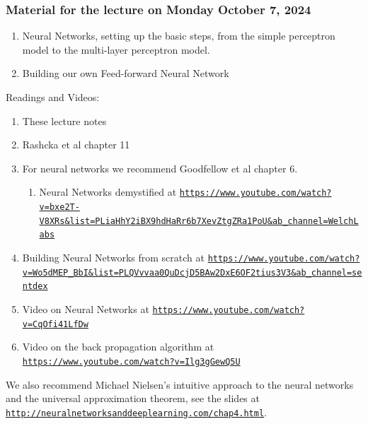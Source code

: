 \documentclass{beamer}
\begin{document}
\begin{frame}
\frametitle{Material for the lecture on Monday October 7, 2024}

\begin{enumerate}
\item Neural Networks, setting up the basic steps, from the simple perceptron model to the multi-layer perceptron model.

\item Building our own Feed-forward Neural Network
\end{enumerate}

\noindent
\begin{block}{Readings and Videos: }
\begin{enumerate}
\item These lecture notes

\item Rashcka et al chapter 11 

\item For neural networks we recommend Goodfellow et al chapter 6.
\begin{enumerate}

 \item Neural Networks demystified at \href{{https://www.youtube.com/watch?v=bxe2T-V8XRs&list=PLiaHhY2iBX9hdHaRr6b7XevZtgZRa1PoU&ab_channel=WelchLabs}}{\nolinkurl{https://www.youtube.com/watch?v=bxe2T-V8XRs&list=PLiaHhY2iBX9hdHaRr6b7XevZtgZRa1PoU&ab_channel=WelchLabs}}

\end{enumerate}

\noindent
\item Building Neural Networks from scratch at \href{{https://www.youtube.com/watch?v=Wo5dMEP_BbI&list=PLQVvvaa0QuDcjD5BAw2DxE6OF2tius3V3&ab_channel=sentdex}}{\nolinkurl{https://www.youtube.com/watch?v=Wo5dMEP_BbI&list=PLQVvvaa0QuDcjD5BAw2DxE6OF2tius3V3&ab_channel=sentdex}}

\item Video on Neural Networks at \href{{https://www.youtube.com/watch?v=CqOfi41LfDw}}{\nolinkurl{https://www.youtube.com/watch?v=CqOfi41LfDw}}

\item Video on the back propagation algorithm at \href{{https://www.youtube.com/watch?v=Ilg3gGewQ5U}}{\nolinkurl{https://www.youtube.com/watch?v=Ilg3gGewQ5U}}
\end{enumerate}

\noindent
We also  recommend Michael Nielsen's intuitive approach to the neural networks and the universal approximation theorem, see the slides at \href{{http://neuralnetworksanddeeplearning.com/chap4.html}}{\nolinkurl{http://neuralnetworksanddeeplearning.com/chap4.html}}.
\end{block}
\end{frame}
\end{document}
